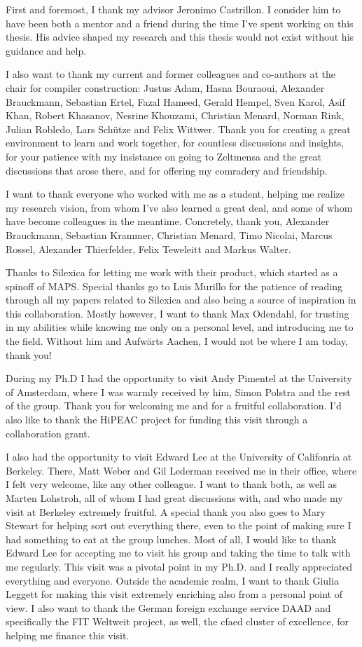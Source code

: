 First and foremost, I thank my advisor Jeronimo Castrillon.
I consider him to have been both a mentor and a friend during the time I've spent working on this thesis.
His advice shaped my research and this thesis would not exist without his guidance and help.

I also want to thank my current and former colleagues and co-authors at the chair for compiler construction:
Justus Adam, Hasna Bouraoui, Alexander Brauckmann, Sebastian Ertel, Fazal Hameed, Gerald Hempel, Sven Karol, Asif Khan, Robert Khasanov, Nesrine Khouzami, Christian Menard, Norman Rink, Julian Robledo, Lars Schütze and Felix Wittwer.
Thank you for creating a great environment to learn and work together, for countless discussions and insights, for your patience with my insistance on going to Zeltmensa and the great discussions that arose there, and for offering my comradery and friendship. 

I want to thank everyone who worked with me as a student, helping me realize my research vision, from whom I've also learned a great deal, and some of whom have become colleagues in the meantime.
Concretely, thank you, Alexander Brauckmann, Sebastian Krammer, Christian Menard, Timo Nicolai, Marcus Rossel, Alexander Thierfelder, Felix Teweleitt and Markus Walter.

Thanks to Silexica for letting me work with their product, which started as a spinoff of \ac{MAPS}.
Special thanks go to Luis Murillo for the patience of reading through all my papers related to Silexica and also being a source of inspiration in this collaboration. 
Mostly however, I want to thank Max Odendahl, for trusting in my abilities while knowing me only on a personal level, and introducing me to the field.
Without him and Aufw\"{a}rts Aachen, I would not be where I am today, thank you! 

During my Ph.D I had the opportunity to visit Andy Pimentel at the University of Amsterdam, where I was warmly received by him, Simon Polstra and the rest of the group.
Thank you for welcoming me and for a fruitful collaboration. I'd also like to thank the HiPEAC project for funding this visit through a collaboration grant.

I also had the opportunity to visit Edward Lee at the University of Califonria at Berkeley. There, Matt Weber and Gil Lederman received me in their office, where I felt very welcome, like any other colleague.
I want to thank both, as well as Marten Lohstroh, all of whom I had great discussions with, and who made my visit at Berkeley extremely fruitful.
A special thank you also goes to Mary Stewart for helping sort out everything there, even to the point of making sure I had something to eat at the group lunches. 
Most of all, I would like to thank Edward Lee for accepting me to visit his group and taking the time to talk with me regularly.
This visit was a pivotal point in my Ph.D. and I really appreciated everything and everyone.
Outside the academic realm, I want to thank Giulia Leggett for making this visit extremely enriching also from a personal point of view.
I also want to thank the German foreign exchange service DAAD and specifically the FIT Weltweit project, as well, the \ac{cfaed} cluster of excellence, for helping me finance this visit.

